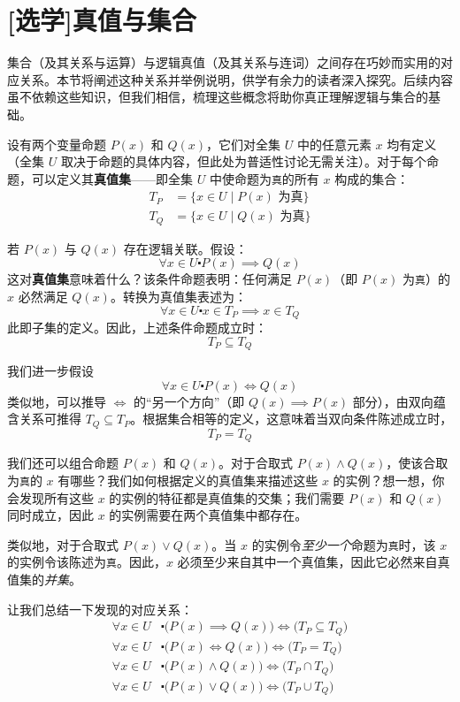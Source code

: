 \section[真值与集合]{[选学]真值与集合}

集合（及其关系与运算）与逻辑真值（及其关系与连词）之间存在巧妙而实用的对应关系。本节将阐述这种关系并举例说明，供学有余力的读者深入探究。后续内容虽不依赖这些知识，但我们相信，梳理这些概念将助你真正理解逻辑与集合的基础。

设有两个变量命题 $P(x)$ 和 $Q(x)$，它们对全集 $U$ 中的任意元素 $x$ 均有定义（全集 $U$ 取决于命题的具体内容，但此处为普适性讨论无需关注）。对于每个命题，可以定义其\textbf{真值集}——即全集 $U$ 中使命题为\verb|真|的所有 $x$ 构成的集合：
\begin{align*}
    T_P &= \{x \in U \mid P(x) \text{\ 为真}\} \\
    T_Q &= \{x \in U \mid Q(x) \text{\ 为真}\}
\end{align*}

若 $P(x)$ 与 $Q(x)$ 存在逻辑关联。假设：
\[\forall x \in U \centerdot P(x) \implies Q(x)\]
这对\textbf{真值集}意味着什么？该条件命题表明：任何满足 $P(x)$（即 $P(x)$ 为\verb|真|）的 $x$ 必然满足 $Q(x)$。转换为真值集表述为：
\[\forall x \in U \centerdot x \in T_P \implies x \in T_Q\]
此即子集的定义。因此，上述条件命题成立时：
\[T_P \subseteq T_Q\]

我们进一步假设
\[\forall x \in U \centerdot P(x) \iff Q(x)\]
类似地，可以推导 $\iff$ 的``另一个方向''（即 $Q(x) \implies P(x)$ 部分），由双向蕴含关系可推得 $T_Q \subseteq T_P$。根据集合相等的定义，这意味着当双向条件陈述成立时，
\[T_P = T_Q\]

我们还可以组合命题 $P(x)$ 和 $Q(x)$。对于合取式 $P(x) \land Q(x)$，使该合取为\verb|真|的 $x$ 有哪些？我们如何根据定义的真值集来描述这些 $x$ 的实例？想一想，你会发现所有这些 $x$ 的实例的特征都是真值集的交集；我们需要 $P(x)$ 和 $Q(x)$ 同时成立，因此 $x$ 的实例需要在两个真值集中都存在。

类似地，对于合取式 $P(x) \lor Q(x)$。当 $x$ 的实例令\emph{至少一个}命题为\verb|真|时，该 $x$ 的实例令该陈述为\verb|真|。因此，$x$ 必须至少来自其中一个真值集，因此它必然来自真值集的\emph{并集}。

让我们总结一下发现的对应关系：
\begin{align*}
    \forall x \in U & \centerdot \big(P(x) \implies Q(x)\big) \iff \big(T_P \subseteq T_Q \big) \\
    \forall x \in U & \centerdot \big(P(x) \iff Q(x)\big) \iff \big(T_P = T_Q \big) \\
    \forall x \in U & \centerdot \big(P(x) \land Q(x)\big) \iff \big(T_P \cap T_Q \big) \\
    \forall x \in U & \centerdot \big(P(x) \lor Q(x)\big) \iff \big(T_P \cup T_Q \big) 
\end{align*}

